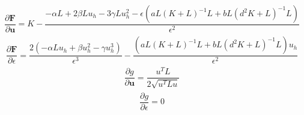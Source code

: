 \documentclass[a4paper, 11pt]{ltjsreport}
\theoremstyle{plain}
\theoremstyle{definition}
\begin{document}
\begin{align}
    \dfrac{\partial \bm{F}}{\partial \bm{u}} 
    = 
    K- \dfrac{-\alpha L + 2\beta  L u_h -3\gamma L u_h^2-\epsilon(aL(K+L)^{-1}L+bL(d^2K+L)^{-1}L) }{\epsilon^2}
\end{align}
\begin{align}
  \dfrac{\partial \bm{F}}{\partial \epsilon}
  =
  \dfrac{2(-\alpha L u_h + \beta  u_h^2 -\gamma  u_h^3)}{\epsilon^3}
  -\dfrac{(aL(K+L)^{-1}L+bL(d^2K+L)^{-1}L)u_h}{\epsilon^2}
\end{align}
\begin{align}
  \dfrac{\partial g}{\partial \bm{u}}= \dfrac{u^T L}{2\sqrt{u^T L u}}
\end{align}
\begin{align}
  \dfrac{\partial g}{\partial \epsilon}=0
\end{align}
\end{document}
